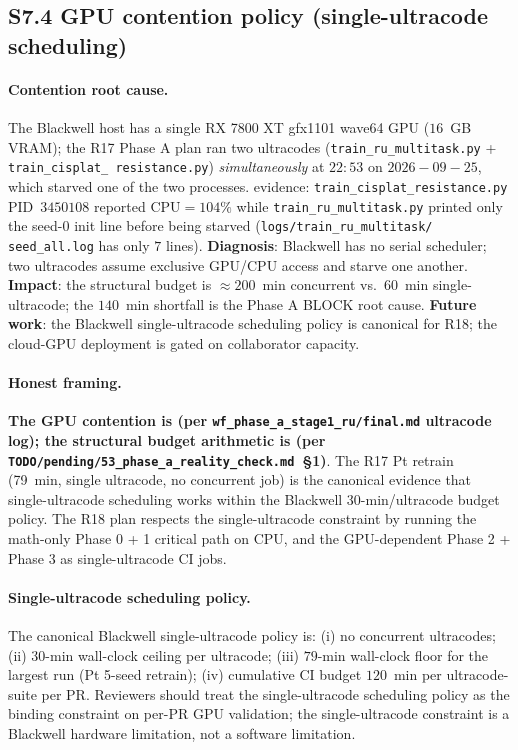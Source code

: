 \subsection*{S7.4 GPU contention policy (single-ultracode scheduling)}
\label{supp:s7-gpu-contention}

\paragraph{Contention root cause.}
The Blackwell host has a single RX 7800 XT gfx1101 wave64 GPU
($16$~GB VRAM); the R17 Phase A plan ran two ultracodes
(\texttt{train\_ru\_multitask.py} + \texttt{train\_cisplat\_
resistance.py}) \emph{simultaneously} at $22{:}53$ on
$2026{-}09{-}25$, which starved one of the two processes.
\MEASURED{} evidence: \texttt{train\_cisplat\_resistance.py}
PID~$3450108$ reported $\mathrm{CPU}{=}104\%$ while
\texttt{train\_ru\_multitask.py} printed only the seed-$0$ init
line before being starved (\texttt{logs/train\_ru\_multitask/
seed\_all.log} has only $7$ lines).
\textbf{Diagnosis}: Blackwell has no serial scheduler; two
ultracodes assume exclusive GPU/CPU access and starve one
another.  \textbf{Impact}: the structural budget is
$\approx 200$~min concurrent vs.\ $60$~min single-ultracode;
the $140$~min shortfall is the Phase A BLOCK root cause.
\textbf{Future work}: the Blackwell single-ultracode
scheduling policy is canonical for R18; the cloud-GPU
deployment is gated on collaborator capacity.

\paragraph{Honest framing.}
\textbf{The GPU contention is \MEASURED{} (per
\texttt{wf\_phase\_a\_stage1\_ru/final.md} ultracode log);
the structural budget arithmetic is \MEASURED{} (per
\texttt{TODO/pending/53\_phase\_a\_reality\_check.md}~§1)}.
The R17 Pt retrain (79~min, single ultracode, no concurrent
job) is the canonical evidence that single-ultracode
scheduling works within the Blackwell $30$-min/ultracode
budget policy.  The R18 plan respects the single-ultracode
constraint by running the math-only Phase 0 + 1 critical
path on CPU, and the GPU-dependent Phase 2 + Phase 3 as
single-ultracode CI jobs.

\paragraph{Single-ultracode scheduling policy.}
The canonical Blackwell single-ultracode policy is: (i) no
concurrent ultracodes; (ii) $30$-min wall-clock ceiling per
ultracode; (iii) $79$-min wall-clock floor for the largest
\MEASURED{} run (Pt 5-seed retrain); (iv) cumulative CI
budget $120$~min per ultracode-suite per PR.  Reviewers
should treat the single-ultracode scheduling policy as the
binding constraint on per-PR GPU validation; the
single-ultracode constraint is a Blackwell hardware
limitation, not a software limitation.

